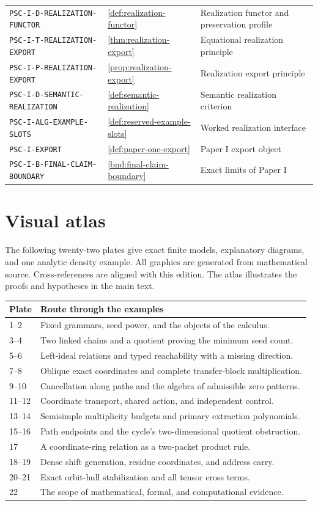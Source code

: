 \documentclass[11pt]{article}
\theoremstyle{definition}
\theoremstyle{remark}
\theoremstyle{definition}\newtheorem{example}[theorem]{Example}
\begin{document}
\begin{longtable}{@{}p{}p{}p{}@{}}
\nolinkurl{PSC-I-D-REALIZATION-FUNCTOR} & \ref{def:realization-functor} & Realization functor and preservation profile \\
\nolinkurl{PSC-I-T-REALIZATION-EXPORT} & \ref{thm:realization-export} & Equational realization principle \\
\nolinkurl{PSC-I-P-REALIZATION-EXPORT} & \ref{prop:realization-export} & Realization export principle \\
\nolinkurl{PSC-I-D-SEMANTIC-REALIZATION} & \ref{def:semantic-realization} & Semantic realization criterion \\
\nolinkurl{PSC-I-ALG-EXAMPLE-SLOTS} & \ref{def:reserved-example-slots} & Worked realization interface \\
\nolinkurl{PSC-I-EXPORT} & \ref{def:paper-one-export} & Paper I export object \\
\nolinkurl{PSC-I-B-FINAL-CLAIM-BOUNDARY} & \ref{bnd:final-claim-boundary} & Exact limits of Paper I \\
\bottomrule\end{longtable}\normalsize
\clearpage\section{Visual atlas}\label{app:visual-atlas}
The following twenty-two plates give exact finite models, explanatory diagrams, and one analytic density example. All graphics are generated from mathematical source. Cross-references are aligned with this edition. The atlas illustrates the proofs and hypotheses in the main text.

\medskip
\begin{longtable}{@{}p{}p{}@{}}
\toprule Plate & Route through the examples\\\midrule\endhead
1--2 & Fixed grammars, seed power, and the objects of the calculus.\\
3--4 & Two linked chains and a quotient proving the minimum seed count.\\
5--6 & Left-ideal relations and typed reachability with a missing direction.\\
7--8 & Oblique exact coordinates and complete transfer-block multiplication.\\
9--10 & Cancellation along paths and the algebra of admissible zero patterns.\\
11--12 & Coordinate transport, shared action, and independent control.\\
13--14 & Semisimple multiplicity budgets and primary extraction polynomials.\\
15--16 & Path endpoints and the cycle's two-dimensional quotient obstruction.\\
17 & A coordinate-ring relation as a two-packet product rule.\\
18--19 & Dense shift generation, residue coordinates, and address carry.\\
20--21 & Exact orbit-hull stabilization and all tensor cross terms.\\
22 & The scope of mathematical, formal, and computational evidence.\\
\bottomrule\end{longtable}
\end{document}
